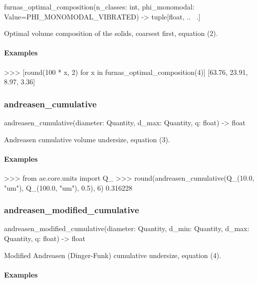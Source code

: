 \documentclass[10pt,a4paper,twoside]{report}
\begin{document}
\begin{verbatimsmall}
furnas_optimal_composition(n_classes: int, phi_monomodal: Value=PHI_MONOMODAL_VIBRATED) -> tuple[float, ..
    \ .]
\end{verbatimsmall}

Optimal volume composition of the solids, coarsest first, equation (2).

\paragraph*{Examples}

\begin{doctestblock}
>>> [round(100 * x, 2) for x in furnas_optimal_composition(4)]
[63.76, 23.91, 8.97, 3.36]
\end{doctestblock}

\subsubsection*{andreasen\_cumulative}

\begin{verbatimsmall}
andreasen_cumulative(diameter: Quantity, d_max: Quantity, q: float) -> float
\end{verbatimsmall}

Andreasen cumulative volume undersize, equation (3).

\paragraph*{Examples}

\begin{doctestblock}
>>> from ae.core.units import Q_
>>> round(andreasen_cumulative(Q_(10.0, "um"), Q_(100.0, "um"), 0.5), 6)
0.316228
\end{doctestblock}

\subsubsection*{andreasen\_modified\_cumulative}

\begin{verbatimsmall}
andreasen_modified_cumulative(diameter: Quantity, d_min: Quantity, d_max: Quantity, q: float) -> float
\end{verbatimsmall}

Modified Andreasen (Dinger-Funk) cumulative undersize, equation (4).

\paragraph*{Examples}
\end{document}
